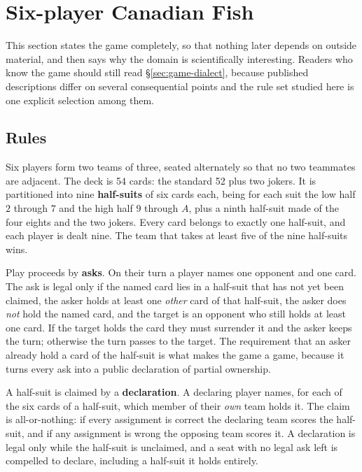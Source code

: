 \section{Six-player Canadian Fish}
\label{sec:game}

This section states the game completely, so that nothing later depends on outside material, and then
says why the domain is scientifically interesting. Readers who know the game should still read
\S\ref{sec:game-dialect}, because published descriptions differ on several consequential points and
the rule set studied here is one explicit selection among them.

\subsection{Rules}
\label{sec:game-rules}

Six players form two teams of three, seated alternately so that no two teammates are adjacent. The
deck is 54 cards: the standard 52 plus two jokers. It is partitioned into nine \textbf{half-suits} of
six cards each, being for each suit the low half $2$ through $7$ and the high half $9$ through $A$,
plus a ninth half-suit made of the four eights and the two jokers. Every card belongs to exactly one
half-suit, and each player is dealt nine. The team that takes at least five of the nine half-suits
wins.

Play proceeds by \textbf{asks}. On their turn a player names one opponent and one card. The ask is
legal only if the named card lies in a half-suit that has not yet been claimed, the asker holds at
least one \emph{other} card of that half-suit, the asker does \emph{not} hold the named card, and the
target is an opponent who still holds at least one card. If the target holds the card they must
surrender it and the asker keeps the turn; otherwise the turn passes to the target. The requirement
that an asker already hold a card of the half-suit is what makes the game a game, because it turns
every ask into a public declaration of partial ownership.

A half-suit is claimed by a \textbf{declaration}. A declaring player names, for each of the six cards
of a half-suit, which member of their \emph{own} team holds it. The claim is all-or-nothing: if every
assignment is correct the declaring team scores the half-suit, and if any assignment is wrong the
opposing team scores it. A declaration is legal only while the half-suit is unclaimed, and a seat with no
legal ask left is compelled to declare, including a half-suit it holds entirely.

